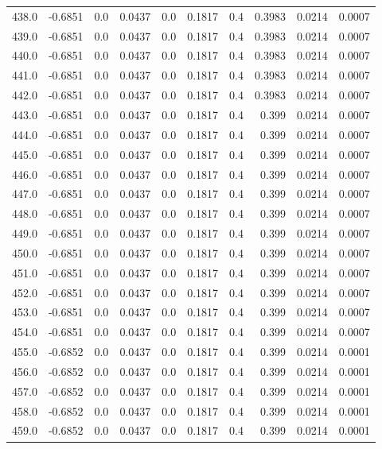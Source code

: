\begin{longtable}{lrrrrrrrrr}
438.0 & -0.6851 & 0.0 & 0.0437 & 0.0 & 0.1817 & 0.4 & 0.3983 & 0.0214 & 0.0007 \\
439.0 & -0.6851 & 0.0 & 0.0437 & 0.0 & 0.1817 & 0.4 & 0.3983 & 0.0214 & 0.0007 \\
440.0 & -0.6851 & 0.0 & 0.0437 & 0.0 & 0.1817 & 0.4 & 0.3983 & 0.0214 & 0.0007 \\
441.0 & -0.6851 & 0.0 & 0.0437 & 0.0 & 0.1817 & 0.4 & 0.3983 & 0.0214 & 0.0007 \\
442.0 & -0.6851 & 0.0 & 0.0437 & 0.0 & 0.1817 & 0.4 & 0.3983 & 0.0214 & 0.0007 \\
443.0 & -0.6851 & 0.0 & 0.0437 & 0.0 & 0.1817 & 0.4 & 0.399 & 0.0214 & 0.0007 \\
444.0 & -0.6851 & 0.0 & 0.0437 & 0.0 & 0.1817 & 0.4 & 0.399 & 0.0214 & 0.0007 \\
445.0 & -0.6851 & 0.0 & 0.0437 & 0.0 & 0.1817 & 0.4 & 0.399 & 0.0214 & 0.0007 \\
446.0 & -0.6851 & 0.0 & 0.0437 & 0.0 & 0.1817 & 0.4 & 0.399 & 0.0214 & 0.0007 \\
447.0 & -0.6851 & 0.0 & 0.0437 & 0.0 & 0.1817 & 0.4 & 0.399 & 0.0214 & 0.0007 \\
448.0 & -0.6851 & 0.0 & 0.0437 & 0.0 & 0.1817 & 0.4 & 0.399 & 0.0214 & 0.0007 \\
449.0 & -0.6851 & 0.0 & 0.0437 & 0.0 & 0.1817 & 0.4 & 0.399 & 0.0214 & 0.0007 \\
450.0 & -0.6851 & 0.0 & 0.0437 & 0.0 & 0.1817 & 0.4 & 0.399 & 0.0214 & 0.0007 \\
451.0 & -0.6851 & 0.0 & 0.0437 & 0.0 & 0.1817 & 0.4 & 0.399 & 0.0214 & 0.0007 \\
452.0 & -0.6851 & 0.0 & 0.0437 & 0.0 & 0.1817 & 0.4 & 0.399 & 0.0214 & 0.0007 \\
453.0 & -0.6851 & 0.0 & 0.0437 & 0.0 & 0.1817 & 0.4 & 0.399 & 0.0214 & 0.0007 \\
454.0 & -0.6851 & 0.0 & 0.0437 & 0.0 & 0.1817 & 0.4 & 0.399 & 0.0214 & 0.0007 \\
455.0 & -0.6852 & 0.0 & 0.0437 & 0.0 & 0.1817 & 0.4 & 0.399 & 0.0214 & 0.0001 \\
456.0 & -0.6852 & 0.0 & 0.0437 & 0.0 & 0.1817 & 0.4 & 0.399 & 0.0214 & 0.0001 \\
457.0 & -0.6852 & 0.0 & 0.0437 & 0.0 & 0.1817 & 0.4 & 0.399 & 0.0214 & 0.0001 \\
458.0 & -0.6852 & 0.0 & 0.0437 & 0.0 & 0.1817 & 0.4 & 0.399 & 0.0214 & 0.0001 \\
459.0 & -0.6852 & 0.0 & 0.0437 & 0.0 & 0.1817 & 0.4 & 0.399 & 0.0214 & 0.0001 \\

\end{longtable}

